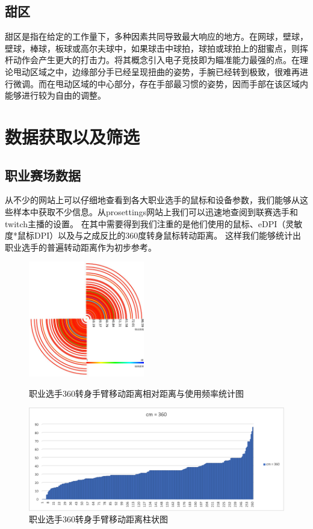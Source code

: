 \documentclass[UTF8]{ctexart}
\begin{document}
\subsection{甜区}
    甜区是指在给定的工作量下，多种因素共同导致最大响应的地方。在网球，壁球，壁球，棒球，板球或高尔夫球中，如果球击中球拍，球拍或球拍上的甜蜜点，则挥杆动作会产生更大的打击力。\cite{wiki:sweet_spot_}将其概念引入电子竞技即为瞄准能力最强的点。在理论甩动区域之中，边缘部分手已经呈现扭曲的姿势，手腕已经转到极致，很难再进行微调。而在甩动区域的中心部分，存在手部最习惯的姿势，因而手部在该区域内能够进行较为自由的调整。
\newpage
\section{数据获取以及筛选}
\subsection{职业赛场数据}
    从不少的网站上可以仔细地查看到各大职业选手的鼠标和设备参数，我们能够从这些样本中获取不少信息。从prosettings网站上我们可以迅速地查阅到联赛选手和twitch主播的设置。 \cite{prosetting_edpi}在其中需要得到我们注重的是他们使用的鼠标、eDPI（灵敏度*鼠标DPI）以及与之成反比的360度转身鼠标转动距离。 \cite{prosetting_guide}这样我们能够统计出职业选手的普遍转动距离作为初步参考。
\begin{figure}[htbp]
    \centering
    \includegraphics[width=0.45\textwidth]{out.jpg}
    \caption{职业选手360转身手臂移动距离相对距离与使用频率统计图}
    \centering
    \includegraphics[width=1\textwidth]{proDataPoly.png}
    \caption{职业选手360转身手臂移动距离柱状图}
\end{figure}
\end{document}
